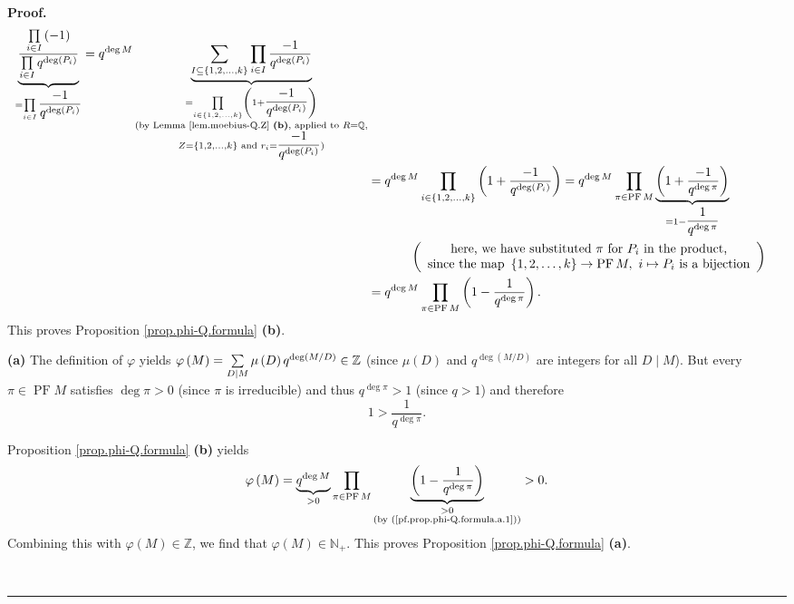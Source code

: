\documentclass[numbers=enddot,12pt,final,onecolumn,notitlepage]{scrartcl}%
\theoremstyle{definition}
\newenvironment{proof}[1][Proof]{\noindent\textbf{#1.} }{\ \rule{0.5em}{0.5em}}
\let\sumnonlimits\sum
\let\prodnonlimits\prod
\renewcommand{\sum}{\sumnonlimits\limits}
\renewcommand{\prod}{\prodnonlimits\limits}
\begin{document}
\begin{proof}
\begin{align*}
\underbrace{\dfrac{\prod_{i\in I}\left(  -1\right)  }{\prod_{i\in I}%
q^{\deg\left(  P_{i}\right)  }}}_{=\prod_{i\in I}\dfrac{-1}{q^{\deg\left(
P_{i}\right)  }}}=q^{\deg M}\underbrace{\sum_{I\subseteq\left\{
1,2,\ldots,k\right\}  }\prod_{i\in I}\dfrac{-1}{q^{\deg\left(  P_{i}\right)
}}}_{\substack{=\prod_{i\in\left\{  1,2,\ldots,k\right\}  }\left(
1+\dfrac{-1}{q^{\deg\left(  P_{i}\right)  }}\right)  \\\text{(by Lemma
\ref{lem.moebius-Q.Z} \textbf{(b)}, applied to }R=\mathbb{Q}\text{,}%
\\Z=\left\{  1,2,\ldots,k\right\}  \text{ and }r_{i}=\dfrac{-1}{q^{\deg\left(
P_{i}\right)  }}\text{)}}}\\
&  =q^{\deg M}\prod_{i\in\left\{  1,2,\ldots,k\right\}  }\left(  1+\dfrac
{-1}{q^{\deg\left(  P_{i}\right)  }}\right)  =q^{\deg M}\prod_{\pi
\in\operatorname*{PF}M}\underbrace{\left(  1+\dfrac{-1}{q^{\deg\pi}}\right)
}_{=1-\dfrac{1}{q^{\deg\pi}}}\\
&  \ \ \ \ \ \ \ \ \ \ \left(
\begin{array}
[c]{c}%
\text{here, we have substituted }\pi\text{ for }P_{i}\text{ in the product,}\\
\text{since the map }\left\{  1,2,\ldots,k\right\}  \rightarrow
\operatorname*{PF}M,\ i\mapsto P_{i}\text{ is a bijection}%
\end{array}
\right) \\
&  =q^{\deg M}\prod_{\pi\in\operatorname*{PF}M}\left(  1-\dfrac{1}{q^{\deg\pi
}}\right)  .
\end{align*}
This proves Proposition \ref{prop.phi-Q.formula} \textbf{(b)}. \medskip

\textbf{(a)} The definition of $\varphi$ yields $\varphi\left(  M\right)
=\sum\limits_{D\mid M}\mu\left(  D\right)  q^{\deg\left(  M/D\right)  }%
\in\mathbb{Z}$ (since $\mu\left(  D\right)  $ and $q^{\deg\left(  M/D\right)
}$ are integers for all $D\mid M$). But every $\pi\in\operatorname*{PF}M$
satisfies $\deg\pi>0$ (since $\pi$ is irreducible) and thus $q^{\deg\pi}>1$
(since $q>1$) and therefore
\begin{equation}
1>\dfrac{1}{q^{\deg\pi}}. \label{pf.prop.phi-Q.formula.a.1}%
\end{equation}


Proposition \ref{prop.phi-Q.formula} \textbf{(b)} yields%
\[
\varphi\left(  M\right)  =\underbrace{q^{\deg M}}_{>0}\prod\limits_{\pi
\in\operatorname*{PF}M}\underbrace{\left(  1-\dfrac{1}{q^{\deg\pi}}\right)
}_{\substack{>0\\\text{(by (\ref{pf.prop.phi-Q.formula.a.1}))}}}>0.
\]
Combining this with $\varphi\left(  M\right)  \in\mathbb{Z}$, we find that
$\varphi\left(  M\right)  \in\mathbb{N}_{+}$. This proves Proposition
\ref{prop.phi-Q.formula} \textbf{(a)}. \medskip


\end{proof}
\end{document}

